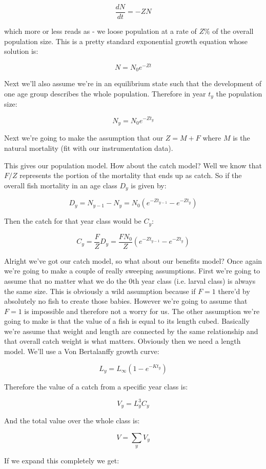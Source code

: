 \documentclass[11pt,a5paper]{book}
\begin{document}
$$\frac{dN}{dt}=-ZN$$

which more or less reads as - we loose population at a rate of $Z\%$ of the overall population size. This is a pretty standard exponential growth equation whose solution is:

$$N = N_0 e^{-Zt}$$

Next we'll also assume we're in an equilibrium state such that the development of one age group describes the whole population. Therefore in year $t_y$ the population size:

$$N_y = N_0 e^{-Zt_y}$$

Next we're going to make the assumption that our $Z=M+F$ where $M$ is the natural mortality (fit with our instrumentation data). 
\newline

This gives our population model. How about the catch model? Well we know that $F/Z$ represents the portion of the mortality that ends up as catch. So if the overall fish mortality in an age class $D_y$ is given by:

$$D_y = N_{y-1} - N_y =N_0(e^{-Zt_{y-1}}- e^{-Zt_y})$$

Then the catch for that year class would be $C_y$:

$$C_y = \frac{F}{Z} D_y = \frac{FN_0}{Z}(e^{-Zt_{y-1}}- e^{-Zt_y})$$

Alright we've got our catch model, so what about our benefits model? Once again we're going to make a couple of really sweeping assumptions. First we're going to assume that no matter what we do the 0th year class (i.e. larval class) is always the same size. This is obviously a wild assumption because if $F=1$ there'd by absolutely no fish to create those babies. However we're going to assume that $F=1$ is impossible and therefore not a worry for us. The other assumption we're going to make is that the value of a fish is equal to its length cubed. Basically we're assume that weight and length are connected by the same relationship and that overall catch weight is what matters. Obviously then we need a length model. We'll use a Von Bertalanffy growth curve:

$$L_y = L_{\infty}(1-e^{-Kt_y})$$

Therefore the value of a catch from a specific year class is:

$$V_y = L_y^3C_y$$

And the total value over the whole class is:

$$V = \sum_y V_y$$

If we expand this completely we get:
\end{document}
